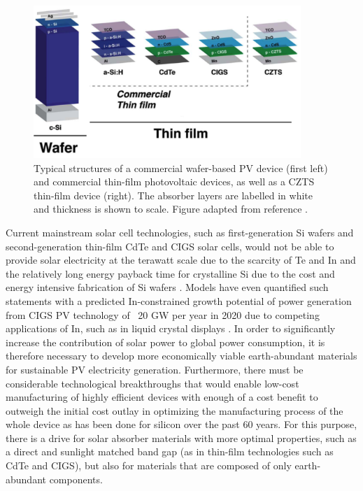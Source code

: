 \begin{figure}[h!]
  \centering
    \includegraphics[width=0.9\textwidth]{figures/thin_films2.png}
    \caption{Typical structures of a commercial wafer-based PV device (first left) and commercial thin-film photovoltaic devices, as well as a CZTS thin-film device (right). The absorber layers are labelled in white and thickness is shown to scale. Figure adapted from reference .}
  \label{thin_films}
\end{figure}

Current mainstream solar cell technologies, such as first-generation Si wafers and second-generation thin-film CdTe and CIGS solar cells, would not be able to provide solar electricity at the terawatt scale due to the scarcity of Te and In and the relatively long energy payback time for crystalline Si due to the cost and energy intensive fabrication of Si wafers \cite{CZTS_vs_MAPI}. 
Models have even quantified such statements with a predicted In-constrained growth potential of power generation from CIGS PV technology of ~20 GW per year in 2020 due to competing applications of In, such as in liquid crystal displays \cite{culprit_5_3}.
In order to significantly increase the contribution of solar power to global power consumption, it is therefore necessary to develop more economically viable earth-abundant materials for sustainable PV electricity generation. Furthermore, there must be considerable technological breakthroughs that would enable low-cost manufacturing of highly efficient devices with enough of a cost benefit to outweigh the initial cost outlay in optimizing the manufacturing process of the whole device as has been done for silicon over the past 60 years. For this purpose, there is a drive for solar absorber materials with more optimal properties, such as a direct and sunlight matched band gap (as in thin-film technologies such as CdTe and CIGS), but also for materials that are composed of only earth-abundant components. 


